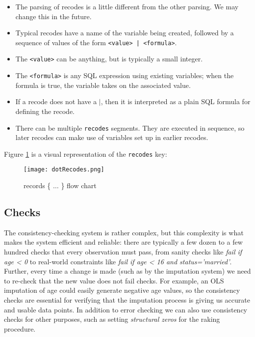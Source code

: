 \documentclass{article}
\begin{document}
\begin{itemize}
\item The parsing of recodes is a little different from the other parsing. We may change
this in the future. 
\item Typical recodes have a name of the variable being created, followed by a sequence of
values of the form {\tt <value> | <formula>}.
\item The {\tt <value>} can be anything, but is typically a small integer.
\item The {\tt <formula>} is any SQL expression using existing variables; when the formula
is true, the variable takes on the associated value.
\item If a recode does not have a $|$, then it is interpreted as a plain SQL formula for
defining the recode.
\item There can be multiple {\tt recodes} segments. They are executed in sequence, so
later recodes can make use of variables set up in earlier recodes.

\end{itemize}

Figure \ref{recodefigure} is a visual representation of the {\tt recodes} key:

\begin{figure}
\begin{center}
\texttt{[image: dotRecodes.png]}
\caption{records \{ $\ldots$ \} flow chart}\label{recodefigure}
\end{center}
\end{figure}

\subsection{Checks}
The consistency-checking system is rather complex, but this complexity is what makes
the system efficient and reliable: there are typically a few dozen to a few hundred
checks that every observation must pass, from sanity checks like {\em fail if age < 0}
to real-world constraints like {\em fail if age < 16 and status='married'}. Further,
every time a change is made (such as by the imputation system) we need to re-check that
the new value does not fail checks. For example, an OLS imputation of age could easily
generate negative age values, so the consistency checks are essential for verifying that
the imputation process is giving us accurate and usable data points. In addition to
error checking we can also use consistency checks for other purposes, such as setting
{\em structural zeros} for the raking procedure.
\end{document}
